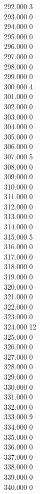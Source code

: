 { 292.000	3 \\
 293.000	0 \\
 294.000	0 \\
 295.000	0 \\
 296.000	0 \\
 297.000	0 \\
 298.000	0 \\
 299.000	0 \\
 300.000	4 \\
 301.000	0 \\
 302.000	0 \\
 303.000	0 \\
 304.000	0 \\
 305.000	0 \\
 306.000	0 \\
 307.000	5 \\
 308.000	0 \\
 309.000	0 \\
 310.000	0 \\
 311.000	0 \\
 312.000	0 \\
 313.000	0 \\
 314.000	0 \\
 315.000	5 \\
 316.000	0 \\
 317.000	0 \\
 318.000	0 \\
 319.000	0 \\
 320.000	0 \\
 321.000	0 \\
 322.000	0 \\
 323.000	0 \\
 324.000	12 \\
 325.000	0 \\
 326.000	0 \\
 327.000	0 \\
 328.000	0 \\
 329.000	0 \\
 330.000	0 \\
 331.000	0 \\
 332.000	0 \\
 333.000	9 \\
 334.000	0 \\
 335.000	0 \\
 336.000	0 \\
 337.000	0 \\
 338.000	0 \\
 339.000	0 \\
 340.000	0 \\
}
